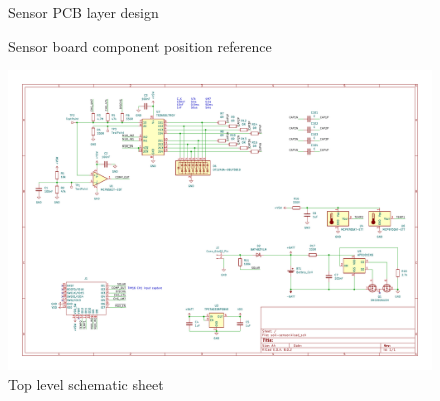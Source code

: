 
\begin{figure}[H]
    \hfill
    \caption{\label{board:sensor}Sensor PCB layer design}
\end{figure}

\begin{figure}[H]
    \hfil
    \caption{\label{board:sensor-components}Sensor board component position reference}
\end{figure}

\begin{figure}
    \includegraphics[page=1,angle=-90,width=\textwidth]{boards/sensor/soil-sensor.pdf}
    \caption{\label{schematic:sensor-1}Top level schematic sheet}
\end{figure}